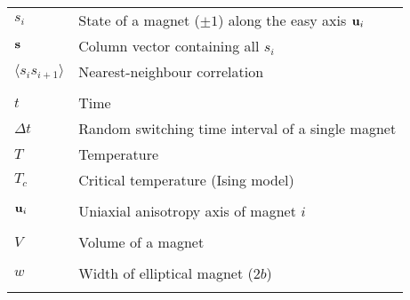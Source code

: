\begin{longtable}[l]{p{60pt} p{350pt}}
	$s_i$ & State of a magnet ($\pm 1$) along the easy axis $\boldsymbol{\mathbf{u}}_i$ \\
	$\boldsymbol{\mathbf{s}}$ & Column vector containing all $s_i$ \\
	$\langle s_i s_{i+1} \rangle$ & Nearest-neighbour correlation \\
	&\\

	$t$ & Time \\
	$\Delta t$ & Random switching time interval of a single magnet \\
	$T$ & Temperature \\
	$T_c$ & Critical temperature (Ising model) \\
	&\\

	$\boldsymbol{\mathbf{u}}_i$ & Uniaxial anisotropy axis of magnet $i$ \\
	&\\

	$V$ & Volume of a magnet \\
	&\\

	$w$ & Width of elliptical magnet ($2b$) \\
	&\\
\end{longtable}

